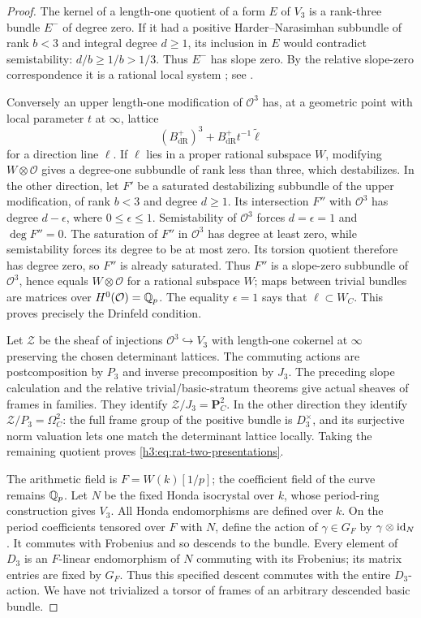 \begin{proof}
The kernel of a length-one quotient of a form $E$ of $V_3$ is
a rank-three bundle $E^-$ of degree zero.  If it had a positive
Harder--Narasimhan subbundle of rank $b<3$ and integral degree
$d\geq1$, its inclusion in $E$ would contradict semistability:
$d/b\geq1/b>1/3$.  Thus $E^-$ has slope zero.  By the relative
slope-zero correspondence it is a rational local system
\cite[Corollary~8.7.10]{KedlayaLiu}; see .

Conversely an upper length-one modification of $\mathcal O^3$
has, at a geometric point with local parameter $t$ at $\infty$,
lattice
\[
 (B_{\mathrm{dR}}^+)^3+
 B_{\mathrm{dR}}^+t^{-1}\widetilde\ell
\]
for a direction line $\ell$.  If $\ell$ lies in a proper
rational subspace $W$, modifying $W\otimes\mathcal O$ gives a
degree-one subbundle of rank less than three, which destabilizes.
In the other direction, let $F'$ be a saturated destabilizing
subbundle of the upper modification, of rank $b<3$ and degree
$d\geq1$.  Its intersection $F''$ with $\mathcal O^3$ has
degree $d-\epsilon$, where $0\leq\epsilon\leq1$.  Semistability
of $\mathcal O^3$ forces $d=\epsilon=1$ and $\deg F''=0$.
The saturation of $F''$ in $\mathcal O^3$ has degree at least zero,
while semistability forces its degree to be at most zero.  Its torsion
quotient therefore has degree zero, so $F''$ is already saturated.
Thus $F''$ is a
slope-zero subbundle of $\mathcal O^3$, hence equals
$W\otimes\mathcal O$ for a rational subspace $W$; maps between
trivial bundles are matrices over $H^0(\mathcal O)=\mathbb Q_p$.
The equality $\epsilon=1$ says that $\ell\subset W_C$.
This proves precisely the Drinfeld condition.

Let $\mathcal Z$ be the sheaf of injections
$\mathcal O^3\hookrightarrow V_3$ with length-one cokernel at
$\infty$ preserving the chosen determinant lattices.  The
commuting actions are postcomposition by $P_3$ and inverse
precomposition by $J_3$.  The preceding slope calculation and
the relative trivial/basic-stratum theorems
\cite[Theorems~III.2.4 and~III.4.5]{FarguesScholze} give actual sheaves of
frames in families.  They identify
$\mathcal Z/J_3=\mathbf P^2_C$.  In the other direction they
identify $\mathcal Z/P_3=\Omega_C^2$: the full frame group of
the positive bundle is $D_3^\times$, and its surjective norm
valuation lets one match the determinant lattice locally.
Taking the remaining quotient proves
\eqref{h3:eq:rat-two-presentations}.

The arithmetic field is $F=W(k)[1/p]$; the coefficient field
of the curve remains $\mathbb Q_p$.  Let $N$ be the fixed Honda
isocrystal over $k$, whose period-ring construction gives
$V_3$.  All Honda endomorphisms are defined over $k$.
On the period coefficients tensored over $F$ with $N$, define
the action of $\gamma\in G_F$ by $\gamma\otimes\mathrm{id}_N$.
It commutes with Frobenius and so descends to the bundle.
Every element of $D_3$ is an $F$-linear endomorphism of $N$
commuting with its Frobenius; its matrix entries are fixed
by $G_F$.  Thus this specified descent commutes with the
entire $D_3$-action.  We have not trivialized a torsor of
frames of an arbitrary descended basic bundle.


\end{proof}
